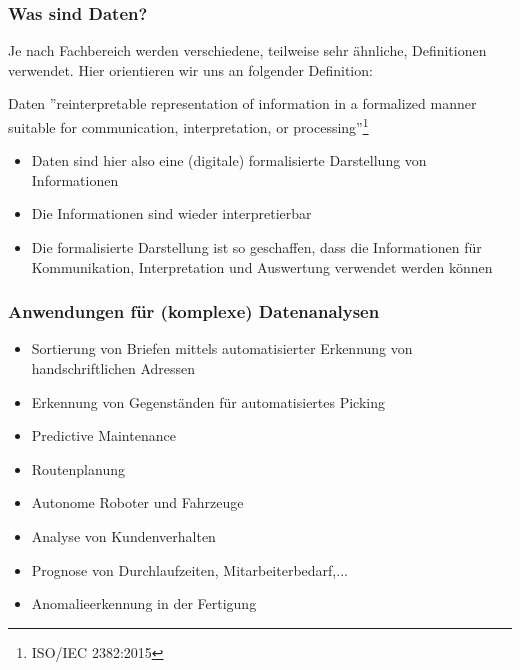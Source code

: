 	\begin{frame}
		\frametitle{Was sind Daten?}
		\pause
		Je nach Fachbereich werden verschiedene, teilweise sehr ähnliche, Definitionen verwendet. Hier orientieren wir uns an folgender Definition:
		\pause
		\begin{block}{Daten}
		''reinterpretable representation of information in a formalized manner suitable for communication, interpretation, or processing''\footnote{ISO/IEC 2382:2015}
		\end{block}
		\pause
		\begin{itemize}
		\item Daten sind hier also eine (digitale) formalisierte Darstellung von Informationen
		\pause
		\item Die Informationen sind wieder interpretierbar
		\pause
		\item Die formalisierte Darstellung ist so geschaffen, dass die Informationen für Kommunikation, Interpretation und Auswertung verwendet werden können 
		\end{itemize}
	\end{frame}



\begin{frame}
\frametitle{Anwendungen für (komplexe) Datenanalysen}
\begin{itemize}[<+->]
\item Sortierung von Briefen mittels automatisierter Erkennung von handschriftlichen Adressen
\item Erkennung von Gegenständen für automatisiertes Picking
\item Predictive Maintenance
\item Routenplanung
\item Autonome Roboter und Fahrzeuge
\item Analyse von Kundenverhalten
\item Prognose von Durchlaufzeiten, Mitarbeiterbedarf,...
\item Anomalieerkennung in der Fertigung
\end{itemize}
\end{frame}